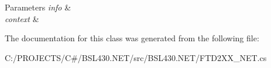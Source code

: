 \begin{DoxyParams}{Parameters}
{\em info} & \\
\hline
{\em context} & \\
\hline
\end{DoxyParams}


The documentation for this class was generated from the following file\+:\begin{DoxyCompactItemize}
\item 
C\+:/\+P\+R\+O\+J\+E\+C\+T\+S/\+C\#/\+B\+S\+L430.\+N\+E\+T/src/\+B\+S\+L430.\+N\+E\+T/F\+T\+D2\+X\+X\+\_\+\+N\+E\+T.\+cs\end{DoxyCompactItemize}
